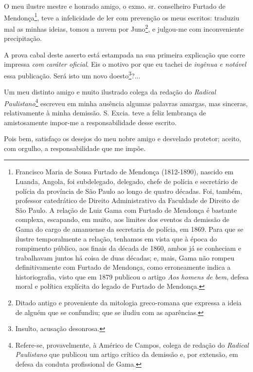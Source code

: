 O meu ilustre mestre e honrado amigo, o exmo. sr. conselheiro Furtado de
Mendonça\footnote{Francisco Maria de Sousa Furtado de Mendonça
  (1812-1890), nascido em Luanda, Angola, foi subdelegado, delegado,
  chefe de polícia e secretário de polícia da província de São Paulo ao
  longo de quatro décadas. Foi, também, professor catedrático de Direito
  Administrativo da Faculdade de Direito de São Paulo. A relação de Luiz
  Gama com Furtado de Mendonça é bastante complexa, escapando, em muito,
  aos limites dos eventos da demissão de Gama do cargo de amanuense da
  secretaria de polícia, em 1869. Para que se ilustre temporalmente a
  relação, tenhamos em vista que à época do rompimento público, aos
  finais da década de 1860, ambos já se conheciam e trabalhavam juntos
  há coisa de duas décadas; e, mais, Gama não rompeu definitivamente com
  Furtado de Mendonça, como erroneamente indica a historiografia, visto
  que em 1879 publicou o artigo \emph{Aos homens de bem}, defesa moral e
  política explícita do legado de Furtado de Mendonça.}, teve a
infelicidade de ler com prevenção os meus escritos: traduziu mal as
minhas ideias, tomou a nuvem por Juno\footnote{Ditado antigo e
  proveniente da mitologia greco-romana que expressa a ideia de alguém
  que se confundiu; que se iludiu com as aparências.}, e julgou-me com
inconveniente precipitação.

A prova cabal deste asserto está estampada na sua primeira explicação
que corre impressa \emph{com} \emph{caráter oficial}. Eis o motivo por
que eu tachei de \emph{ingênua e notável} essa publicação. Será isto um
novo doesto\footnote{Insulto, acusação desonrosa.}?...

Um meu distinto amigo e muito ilustrado colega da redação do
\emph{Radical Paulistano}\footnote{Refere-se, provavelmente, à Américo
  de Campos, colega de redação do \emph{Radical Paulistano} que publicou
  um artigo crítico da demissão e, por extensão, em defesa da conduta
  profissional de Gama.} escreveu em minha ausência algumas palavras
amargas, mas sinceras, relativamente à minha demissão. S. Excia. teve a
feliz lembrança de amistosamente impor-me a responsabilidade desse
escrito.

Pois bem, satisfaço os desejos do meu nobre amigo e desvelado protetor;
aceito, com orgulho, a responsabilidade que me impõe.

